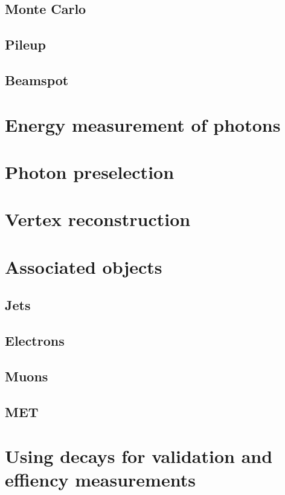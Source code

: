 \subsection{Monte Carlo}
\subsection{Pileup}
\subsection{Beamspot}

\section{Energy measurement of photons}
\label{sec:photon_energy}

\section{Photon preselection}
\label{sec:photon_presel}

\section{Vertex reconstruction}
\label{sec:vtx_reco}

\section{Associated objects}
\subsection{Jets}
\subsection{Electrons}
\subsection{Muons}
\subsection{MET}

\section{Using \Zee decays for validation and effiency measurements}

